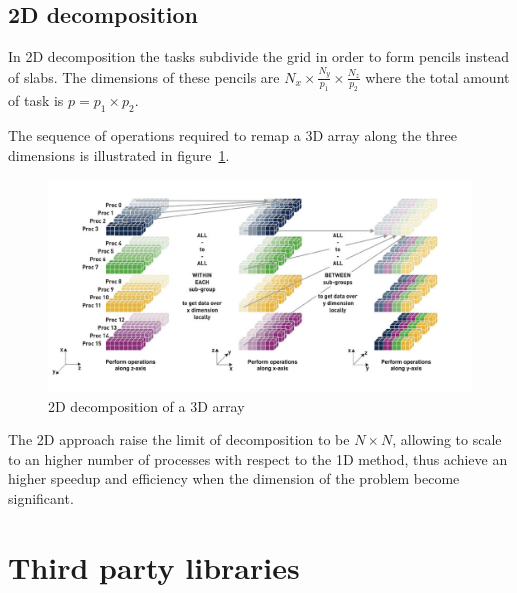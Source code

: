 \subsection{2D decomposition}
In 2D decomposition the tasks subdivide the grid in order to form pencils instead of slabs. The dimensions of these pencils are $N_{x}\times \frac{N_{y}}{p_{1}}\times \frac{N_{z}}{p_{2}}$ where the total amount of task is $p = p_{1}\times p_{2}$.
\par
The sequence of operations required to remap a 3D array along the three dimensions is illustrated in figure~\ref{2d:decomp}. 
\par
\begin{figure}[h]
\begin{center}
\includegraphics[width=1.08\textwidth]{grafici/2d_decomp}
\caption{2D decomposition of a 3D array}
\label{2d:decomp}
\end{center}
\end{figure}
The 2D approach raise the limit of decomposition to be $N\times N$, allowing to scale to an higher number of processes with respect to the 1D method, thus achieve an higher speedup and efficiency when the dimension of the problem become significant.




\section{Third party libraries}

